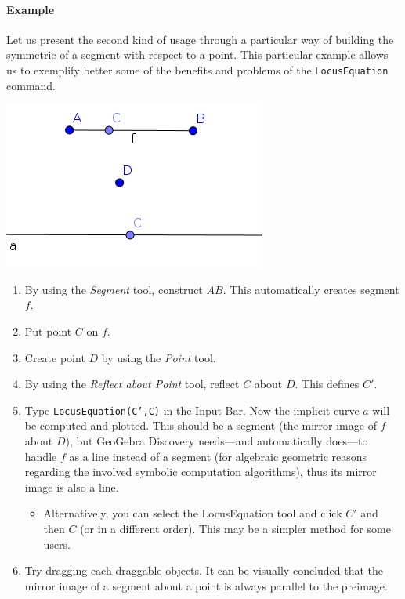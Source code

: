 \documentclass{article}
\begin{document}
\begin{itemize}
\paragraph{Example}
Let us present the second kind of usage through a particular way of
building the symmetric of a segment with respect to a point.
This particular example allows us to exemplify
better some of the benefits and problems of the \texttt{LocusEquation} command.
\begin{center}
\includegraphics[scale=0.5]{LocusEquation-example-explicit}
\end{center}
\begin{enumerate}
    \item By using the \textit{Segment} tool, construct $AB$. This automatically creates segment $f$.
    \item Put point $C$ on $f$.
    \item Create point $D$ by using the \textit{Point} tool.
    \item By using the \textit{Reflect about Point} tool, reflect $C$ about $D$. This defines $C'$.
    \item Type \texttt{LocusEquation(C',C)} in the Input Bar. Now the implicit curve $a$ will be computed and plotted. This should be a segment (the mirror image of $f$ about $D$), but GeoGebra Discovery needs---and automatically does---to handle $f$ as a line instead of a segment (for algebraic geometric reasons regarding the involved symbolic computation algorithms), thus its mirror image is also a line.
    \begin{itemize}
    \item Alternatively, you can select the LocusEquation tool  and click $C'$ and then $C$ (or in a different order). This may be a simpler method for some users.
    \end{itemize}
    \item Try dragging each draggable objects. It can be visually concluded that the mirror image of a segment about a point is always parallel to the preimage.
\end{enumerate}


\end{itemize}
\end{document}
